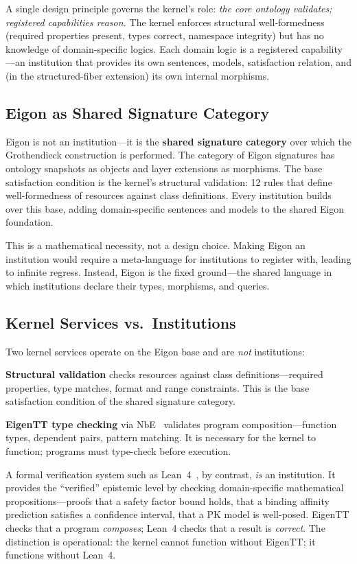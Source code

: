 \documentclass[10pt,twocolumn,letterpaper]{article}
\begin{document}
A single design principle governs the kernel's role: \emph{the core ontology validates; registered capabilities reason.}
The kernel enforces structural well-formedness (required properties present, types correct, namespace integrity) but has no knowledge of domain-specific logics.
Each domain logic is a registered capability---an institution that provides its own sentences, models, satisfaction relation, and (in the structured-fiber extension) its own internal morphisms.

\subsection{Eigon as Shared Signature Category}

Eigon is not an institution---it is the \textbf{shared signature category} over which the Grothendieck construction is performed.
The category of Eigon signatures has ontology snapshots as objects and layer extensions as morphisms.
The base satisfaction condition is the kernel's structural validation: 12 rules that define well-formedness of resources against class definitions.
Every institution builds over this base, adding domain-specific sentences and models to the shared Eigon foundation.

This is a mathematical necessity, not a design choice.
Making Eigon an institution would require a meta-language for institutions to register with, leading to infinite regress.
Instead, Eigon is the fixed ground---the shared language in which institutions declare their types, morphisms, and queries.

\subsection{Kernel Services vs.\ Institutions}

Two kernel services operate on the Eigon base and are \emph{not} institutions:

\textbf{Structural validation} checks resources against class definitions---required properties, type matches, format and range constraints.
This is the base satisfaction condition of the shared signature category.

\textbf{EigenTT type checking} via NbE~\cite{minitt,nbe} validates program composition---function types, dependent pairs, pattern matching.
It is necessary for the kernel to function; programs must type-check before execution.

A formal verification system such as Lean~4~\cite{lean4}, by contrast, \emph{is} an institution.
It provides the ``verified'' epistemic level by checking domain-specific mathematical propositions---proofs that a safety factor bound holds, that a binding affinity prediction satisfies a confidence interval, that a PK model is well-posed.
EigenTT checks that a program \emph{composes}; Lean~4 checks that a result is \emph{correct}.
The distinction is operational: the kernel cannot function without EigenTT; it functions without Lean~4.
\end{document}
